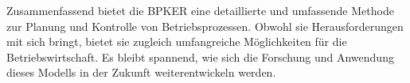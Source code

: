 Zusammenfassend bietet die BPKER eine detaillierte und umfassende Methode zur Planung und Kontrolle von Betriebsprozessen. Obwohl sie Herausforderungen mit sich bringt, bietet sie zugleich umfangreiche Möglichkeiten für die Betriebswirtschaft. Es bleibt spannend, wie sich die Forschung und Anwendung dieses Modells in der Zukunft weiterentwickeln werden.